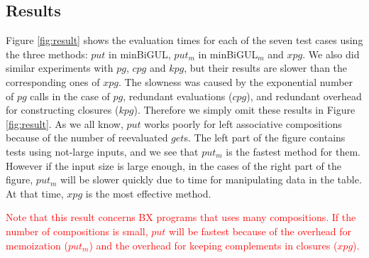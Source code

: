 \subsection{Results}




Figure \ref{fig:result} 
shows the evaluation times for each of the seven test cases using the three methods: $put$ in minBiGUL, $put_m$ in minBiGUL$_m$ and $xpg$.
We also did similar experiments with $pg$, $cpg$ and $kpg$, but their results are slower than the corresponding ones of $xpg$. The slowness was caused by the exponential number of $pg$ calls in the case of $pg$, redundant evaluations ($cpg$), and redundant overhead for constructing closures ($kpg$).
Therefore we simply omit these results in Figure \ref{fig:result}.
As we all know, $put$ works poorly for left associative compositions because of the number of reevaluated $get$s.
The left part of the figure contains tests using not-large inputs, and we see that $put_m$ is the fastest method for them. However if the input size is large enough, in the cases of the right part of the figure, $put_m$ will be slower quickly due to time for manipulating data in the table. At that time, $xpg$ is 
the most effective method.

\textcolor{red}{Note that this result concerns BX programs that uses many compositions. If the number of compositions is small, $put$ will be fastest because of the overhead for memoization ($put_m$) and the overhead for keeping complements in closures ($xpg$).}

